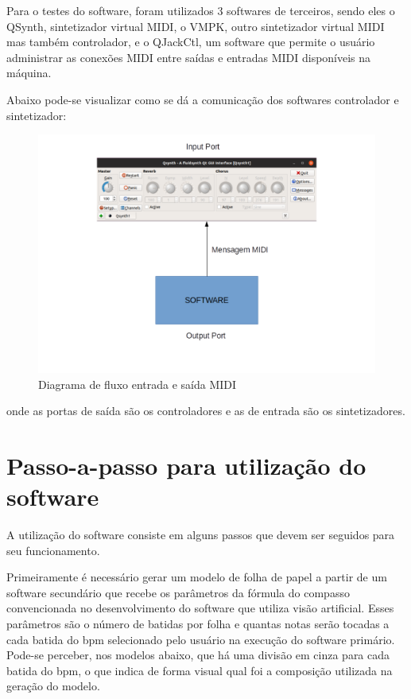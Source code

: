 \documentclass[12pt]{report}
\begin{document}
Para o testes do software, foram utilizados 3 softwares de terceiros,
sendo eles o QSynth, sintetizador virtual MIDI, o VMPK, outro
sintetizador virtual MIDI mas também controlador, e o QJackCtl, um
software que permite o usuário administrar as conexões MIDI entre
saídas e entradas MIDI disponíveis na máquina.

Abaixo pode-se visualizar como se dá a comunicação dos softwares
controlador e sintetizador:

\begin{figure}[H]
  \centering
  \includegraphics[width=1\textwidth]{imagens/Diagrama2.png}
  \caption{Diagrama de fluxo entrada e saída MIDI}
  \label{fig:diagrama}
\end{figure}

\noindent onde as portas de saída são os controladores e as de entrada
são os sintetizadores.



\chapter{Passo-a-passo para utilização do software}
A utilização do software consiste em alguns passos que devem ser
seguidos para seu funcionamento.

Primeiramente é necessário gerar um modelo de folha de papel a partir
de um software secundário que recebe os parâmetros da fórmula do
compasso convencionada no desenvolvimento do software que utiliza
visão artificial. Esses parâmetros são o número de batidas por folha e
quantas notas serão tocadas a cada batida do bpm selecionado pelo
usuário na execução do software primário. Pode-se perceber, nos
modelos abaixo, que há uma divisão em cinza para cada batida do bpm, o
que indica de forma visual qual foi a composição utilizada na geração
do modelo.
\end{document}
